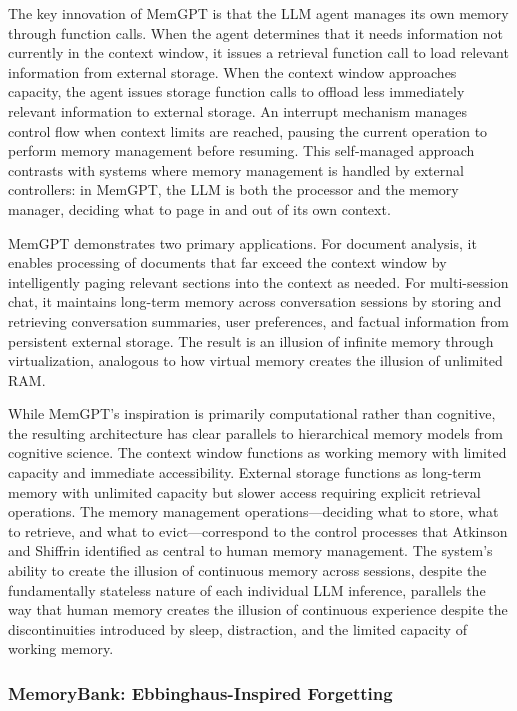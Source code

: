\documentclass[11pt,letterpaper]{article}
\begin{document}
The key innovation of MemGPT is that the LLM agent manages its own memory through function calls. When the agent determines that it needs information not currently in the context window, it issues a retrieval function call to load relevant information from external storage. When the context window approaches capacity, the agent issues storage function calls to offload less immediately relevant information to external storage. An interrupt mechanism manages control flow when context limits are reached, pausing the current operation to perform memory management before resuming. This self-managed approach contrasts with systems where memory management is handled by external controllers: in MemGPT, the LLM is both the processor and the memory manager, deciding what to page in and out of its own context.

MemGPT demonstrates two primary applications. For document analysis, it enables processing of documents that far exceed the context window by intelligently paging relevant sections into the context as needed. For multi-session chat, it maintains long-term memory across conversation sessions by storing and retrieving conversation summaries, user preferences, and factual information from persistent external storage. The result is an illusion of infinite memory through virtualization, analogous to how virtual memory creates the illusion of unlimited RAM.

While MemGPT's inspiration is primarily computational rather than cognitive, the resulting architecture has clear parallels to hierarchical memory models from cognitive science. The context window functions as working memory with limited capacity and immediate accessibility. External storage functions as long-term memory with unlimited capacity but slower access requiring explicit retrieval operations. The memory management operations---deciding what to store, what to retrieve, and what to evict---correspond to the control processes that Atkinson and Shiffrin identified as central to human memory management. The system's ability to create the illusion of continuous memory across sessions, despite the fundamentally stateless nature of each individual LLM inference, parallels the way that human memory creates the illusion of continuous experience despite the discontinuities introduced by sleep, distraction, and the limited capacity of working memory.

\subsubsection{MemoryBank: Ebbinghaus-Inspired Forgetting}
\end{document}
